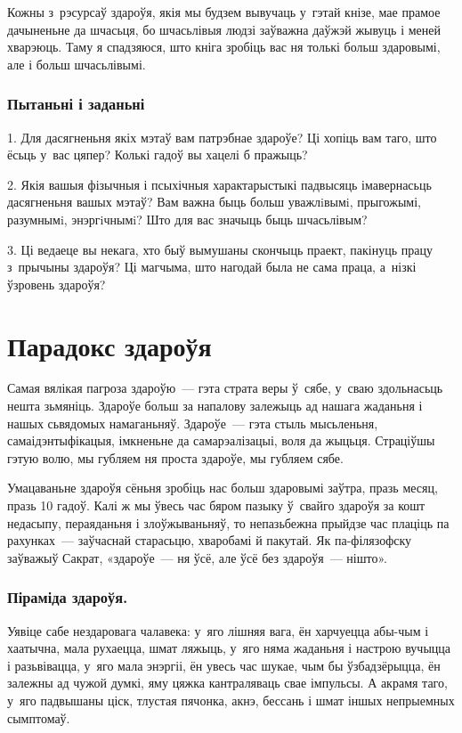 Кожны з~рэсурсаў здароўя, якія мы будзем вывучаць у~гэтай кнізе, мае прамое дачыненьне да шчасьця, бо шчасьлівыя людзі заўважна даўжэй жывуць і меней хварэюць. Таму я спадзяюся, што кніга зробіць вас ня толькі больш здаровымі, але і больш шчасьлівымі.


\subsubsection{Пытаньні і заданьні}

1. Для дасягненьня якіх мэтаў вам патрэбнае здароўе? Ці хопіць вам таго, што ёсьць у~вас цяпер? Колькі гадоў вы хацелі б пражыць?

2. Якія вашыя фізычныя і псыхічныя характарыстыкі падвысяць імавернасьць дасягненьня вашых мэтаў? Вам важна быць больш уважлiвымi, прыгожымі, разумнымi, энэргiчнымi? Што для вас значыць быць шчасьлівым?

3. Ці ведаеце вы некага, хто быў вымушаны скончыць праект, пакінуць працу з~прычыны здароўя? Ці магчыма, што нагодай была не сама праца, а~нізкі ўзровень здароўя?


\section{Парадокс здароўя}

Самая вялікая пагроза здароўю~--- гэта страта веры ў~сябе, у~сваю здольнасьць нешта зьмяніць. Здароўе больш за напалову залежыць ад нашага жаданьня і нашых сьвядомых намаганьняў. Здароўе~--- гэта стыль мысьленьня, самаідэнтыфікацыя, імкненьне да самарэалізацыі, воля да жыцьця. Страціўшы гэтую волю, мы губляем ня проста здароўе, мы губляем сябе. 


Умацаваньне здароўя сёньня зробіць нас больш здаровымі заўтра, празь месяц, празь 10 гадоў. Калі ж мы ўвесь час бяром пазыку ў~свайго здароўя за кошт недасыпу, пераяданьня і злоўжываньняў, то непазьбежна прыйдзе час плаціць па рахунках~--- заўчаснай старасьцю, хваробамі й пакутай. Як па-філязофску заўважыў Сакрат, «здароўе~--- ня ўсё, але ўсё без здароўя~--- нішто».

\subsubsection{Піраміда здароўя.}

Уявіце сабе нездаровага чалавека: у~яго лішняя вага, ён харчуецца абы-чым і хаатычна, мала рухаецца, шмат ляжыць, у~яго няма жаданьня і настрою вучыцца і разьвівацца, у~яго мала энэргіі, ён увесь час шукае, чым бы ўзбадзёрыцца, ён залежны ад чужой думкі, яму цяжка кантраляваць свае імпульсы. А акрамя таго, у~яго падвышаны ціск, тлустая пячонка, акнэ, бессань і шмат іншых непрыемных сымптомаў.

